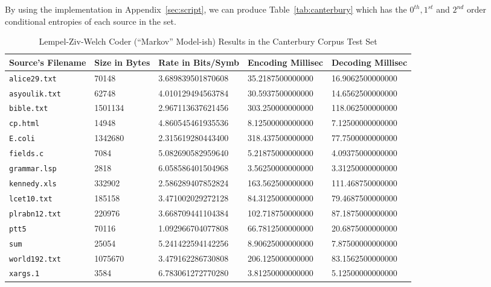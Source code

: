 \documentclass[a4paper, twocolumn]{article}
\begin{document}
        By using the implementation in Appendix~\ref{sec:script}, we can produce Table~\ref{tab:canterbury} which has the \(0^{th}, 1^{st}\) and \(2^{nd}\) order conditional entropies of each source in the set.

    \begin{table*}[t]
        \centering
        \begin{tabular}{lllll}
        \toprule
            Source's Filename & Size in Bytes & Rate in Bits/Symb & Encoding Millisec & Decoding Millisec \\
        \midrule
            \texttt{alice29.txt}  &   70148 & 3.689839501870608 & 35.2187500000000 & 16.9062500000000 \\
            \texttt{asyoulik.txt} &   62748 & 4.010129494563784 & 30.5937500000000 & 14.6562500000000 \\
            \texttt{bible.txt}    & 1501134 & 2.967113637621456 & 303.250000000000 & 118.062500000000 \\
            \texttt{cp.html}      &   14948 & 4.860545461935536 & 8.12500000000000 & 7.12500000000000 \\
            \texttt{E.coli}       & 1342680 & 2.315619280443400 & 318.437500000000 & 77.7500000000000 \\
            \texttt{fields.c}     &    7084 & 5.082690582959640 & 5.21875000000000 & 4.09375000000000 \\
            \texttt{grammar.lsp}  &    2818 & 6.058586401504968 & 3.56250000000000 & 3.31250000000000 \\
            \texttt{kennedy.xls}  &  332902 & 2.586289407852824 & 163.562500000000 & 111.468750000000 \\
            \texttt{lcet10.txt}   &  185158 & 3.471002029272128 & 84.3125000000000 & 79.4687500000000 \\
            \texttt{plrabn12.txt} &  220976 & 3.668709441104384 & 102.718750000000 & 87.1875000000000 \\
            \texttt{ptt5}         &   70116 & 1.092966704077808 & 66.7812500000000 & 20.6875000000000 \\
            \texttt{sum}          &   25054 & 5.241422594142256 & 8.90625000000000 & 7.87500000000000 \\
            \texttt{world192.txt} & 1075670 & 3.479162286730808 & 206.125000000000 & 83.1562500000000 \\
            \texttt{xargs.1}      &    3584 & 6.783061272770280 & 3.81250000000000 & 5.12500000000000 \\
        \bottomrule
        \end{tabular}
        \caption{Lempel-Ziv-Welch Coder (``Markov'' Model-ish) Results in the Canterbury Corpus Test Set}
        \label{tab:lzw}
    \end{table*}
\end{document}
